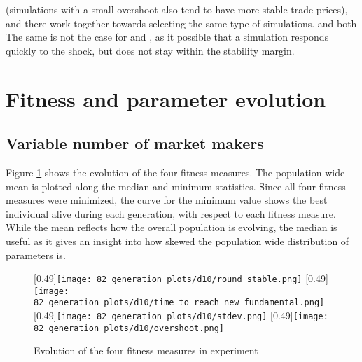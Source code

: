  (simulations with a small overshoot also tend to have more stable trade prices), and there work together towards selecting the same type of simulations. \timetoreachnewfundamental and \roundstable both  The same is not the case for \timetoreachnewfundamental and \roundstable, as it possible that a simulation responds quickly to the shock, but does not stay within the stability margin. 

\section{Fitness and parameter evolution}\label{section:fitness_and_paraeter_evolution}


\subsection{Variable number of market makers}

Figure \ref{fig:d10_evolution_fitness} shows the evolution of the four fitness measures. The population wide mean is plotted along the median and minimum statistics. Since all four fitness measures were minimized, the curve for the minimum value shows the best individual alive during each generation, with respect to each fitness measure. While the mean reflects how the overall population is evolving,  the median is useful as it gives an insight into how skewed the population wide distribution of parameters is. 


\begin{figure}
	\centering
	[0.49\linewidth]{\texttt{[image: 82\_generation\_plots/d10/round\_stable.png]}}
	[0.49\linewidth]{\texttt{[image: 82\_generation\_plots/d10/time\_to\_reach\_new\_fundamental.png]}}
	[0.49\linewidth]{\texttt{[image: 82\_generation\_plots/d10/stdev.png]}}
	[0.49\linewidth]{\texttt{[image: 82\_generation\_plots/d10/overshoot.png]}}
	\caption{Evolution of the four fitness measures in experiment \dten}
	\label{fig:d10_evolution_fitness}
\end{figure}





